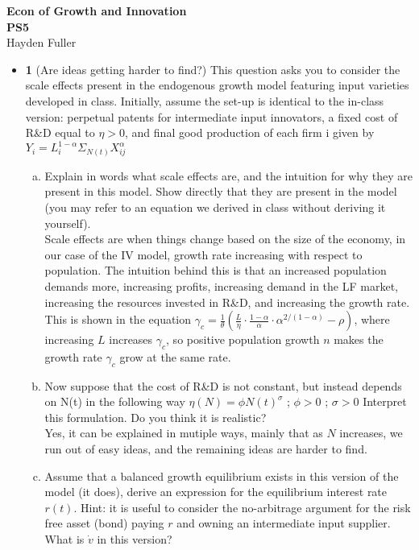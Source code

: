 \documentclass[11pt]{article}
\begin{document}
\thispagestyle{empty}   %

\begin{center}
\large
\textbf{Econ of Growth and Innovation \\
PS5}
\\Hayden Fuller
\end{center}

\begin{itemize}

\item \textbf{1} 
(Are ideas getting harder to find?) This question asks you to consider the scale effects present in the endogenous growth model featuring input varieties developed in class. Initially, assume the set-up is identical to the in-class version: perpetual patents for intermediate input innovators, a fixed cost of R\&D equal to $\eta > 0$, and final good production of each firm i given by $Y_i=L_i^{1-\alpha}\Sigma_{N(t)}X_{ij}^\alpha$
\begin{enumerate}[(a)]
\item Explain in words what scale effects are, and the intuition for why they are present in this model. Show directly that they are present in the model (you may refer to an equation we derived in class without deriving it yourself).
\\Scale effects are when things change based on the size of the economy, in our case of the IV model, growth rate increasing with respect to population. The intuition behind this is that an increased population demands more, increasing profits, increasing demand in the LF market, increasing the resources invested in R\&D, and increasing the growth rate. This is shown in the equation $\gamma_c=\frac{1}{\theta}(\frac{L}{\eta}\cdot\frac{1-\alpha}{\alpha}\cdot\alpha^{2/(1-\alpha)}-\rho)$, where increasing $L$ increases $\gamma_c$, so positive population growth $n$ makes the growth rate $\gamma_c$ grow at the same rate.
\item Now suppose that the cost of R\&D is not constant, but instead depends on N(t) in the following way $\eta(N) = \phi N(t)^\sigma$ ; $\phi > 0$ ; $\sigma > 0$ Interpret this formulation. Do you think it is realistic?
\\Yes, it can be explained in mutiple ways, mainly that as $N$ increases, we run out of easy ideas, and the remaining ideas are harder to find.
\item Assume that a balanced growth equilibrium exists in this version of the model (it does), derive an expression for the equilibrium interest rate $r(t)$. Hint: it is useful to consider the no-arbitrage argument for the risk free asset (bond) paying $r$ and owning an intermediate input supplier. What is $\dot v$ in this version?

\end{enumerate}
\end{itemize}
\end{document}
